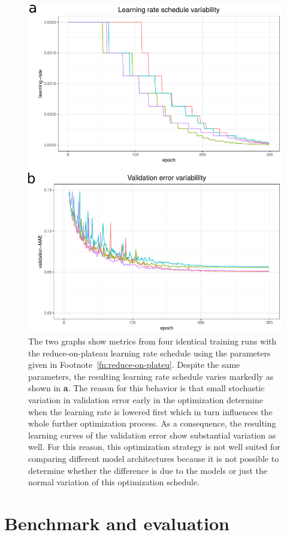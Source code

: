 \begin{figure}[H]
	\includegraphics[width=0.9\linewidth]{figures/optimization-variabiliy}
	
	\caption{The two graphs show metrics from four identical training runs with the reduce-on-plateau learning rate schedule using the parameters given in Footnote~\ref{fn:reduce-on-plateu}. Despite the same parameters, the resulting learning rate schedule varies markedly as shown in \textbf{a}. The reason for this behavior is that small stochastic variation in validation error early in the optimization determine when the learning rate is lowered first which in turn influences the whole further optimization process. As a consequence, the resulting learning curves of the validation error show substantial variation as well. For this reason, this optimization strategy is not well suited for comparing different model architectures because it is not possible to determine whether the difference is due to the models or just the normal variation of this optimization schedule.}
	\label{fig:optimization-variablility}
\end{figure}

\section{Benchmark and evaluation}

